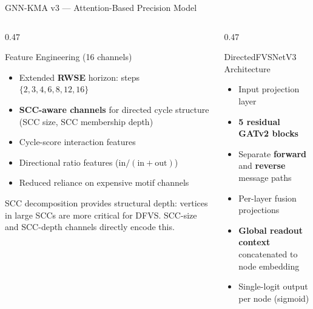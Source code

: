 \documentclass[aspectratio=169,10pt]{beamer}
\renewcommand{\footnotesize}{\tiny}
\begin{document}
\begin{frame}{GNN-KMA v3 — Attention-Based Precision Model}
  \begin{columns}[T]
    \begin{column}{0.47\textwidth}
      \begin{block}{Feature Engineering (16 channels)}
        \begin{itemize}\setlength\itemsep{2pt}
          \item Extended \textbf{RWSE} horizon: steps $\{2,3,4,6,8,12,16\}$
            \cite{dwivedi2021}
          \item \textbf{SCC-aware channels} for directed cycle structure
            (SCC size, SCC membership depth)
          \item Cycle-score interaction features
          \item Directional ratio features ($\text{in}/(\text{in}+\text{out})$)
          \item Reduced reliance on expensive motif channels
        \end{itemize}
      \end{block}
      \vspace{3pt}
      \begin{tcolorbox}[algbox,title=SCC Channels (Directed)]
        \footnotesize
        SCC decomposition \cite{tarjan1972} provides structural depth:
        vertices in large SCCs are more critical for DFVS.
        SCC-size and SCC-depth channels directly encode this.
      \end{tcolorbox}
    \end{column}
    \begin{column}{0.47\textwidth}
      \begin{block}{DirectedFVSNetV3 Architecture}
        \begin{itemize}\setlength\itemsep{2pt}
          \item Input projection layer
          \item \textbf{5 residual GATv2 blocks} \cite{brody2022}
          \item Separate \textbf{forward} and \textbf{reverse} message paths
          \item Per-layer fusion projections
          \item \textbf{Global readout context} concatenated to node embedding
          \item Single-logit output per node (sigmoid)
        \end{itemize}

\end{block}
\end{column}
\end{columns}
\end{frame}
\end{document}
